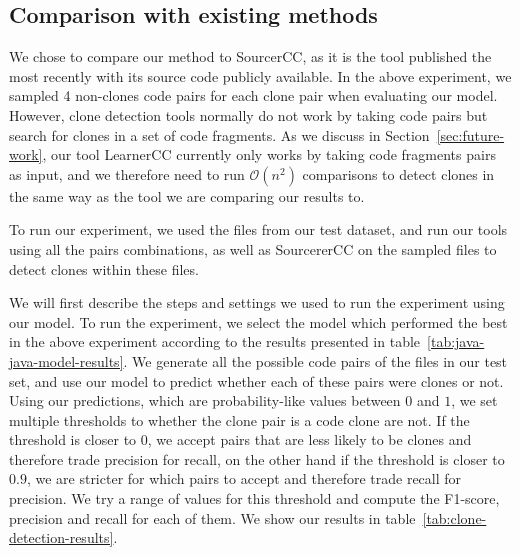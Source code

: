 \subsection{Comparison with existing methods}
We chose to compare our method to
SourcerCC\cite{Sajnani:2016:SSC:2884781.2884877}, as it is the tool published
the most recently with its source code publicly available. In the above
experiment, we sampled 4 non-clones code pairs for each clone pair when
evaluating our model. However, clone detection tools normally do not work by
taking code pairs but search for clones in a set of code fragments. As we
discuss in Section~\ref{sec:future-work}, our tool LearnerCC currently only
works by taking code fragments pairs as input, and we therefore need to run
$\mathcal{O}\left( n^2 \right)$ comparisons to detect clones in the same way as
the tool we are comparing our results to.

To run our experiment, we used the files from our test dataset, and run
our tools using all the pairs combinations, as well as SourcererCC on the
sampled files to detect clones within these files.

We will first describe the steps and settings we used to run the experiment
using our model. To run the experiment, we select the model which performed
the best in the above experiment according to the results presented in
table~\ref{tab:java-java-model-results}. We generate all the possible code
pairs of the files in our test set, and use our model to predict whether each
of these pairs were clones or not. Using our predictions, which are
probability-like values between $0$ and $1$, we set multiple thresholds to
whether the clone pair is a code clone are not. If the threshold is closer to
$0$, we accept pairs that are less likely to be clones and therefore trade
precision for recall, on the other hand if the threshold is closer to $0.9$, we
are stricter for which pairs to accept and therefore trade recall for precision.
We try a range of values for this threshold and compute the F1-score, precision
and recall for each of them. We show our results in
table~\ref{tab:clone-detection-results}.

